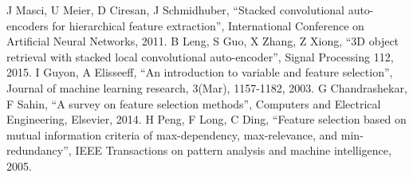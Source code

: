 \documentclass[letterpaper, 10 pt, conference]{ieeeconf}  %
\begin{document}
\begin{thebibliography}{99}
J Masci, U Meier, D Ciresan, J Schmidhuber, ``Stacked convolutional auto-encoders for hierarchical feature extraction'', International Conference on Artificial Neural Networks, 2011.
B Leng, S Guo, X Zhang, Z Xiong, ``3D object retrieval with stacked local convolutional auto-encoder'', Signal Processing 112, 2015.
I Guyon, A Elisseeff, ``An introduction to variable and feature selection'', Journal of machine learning research, 3(Mar), 1157-1182, 2003.
G Chandrashekar, F Sahin, ``A survey on feature selection methods'', Computers and Electrical Engineering, Elsevier,  2014.
H Peng, F Long, C Ding, ``Feature selection based on mutual information criteria of max-dependency, max-relevance, and min-redundancy'', IEEE Transactions on pattern analysis and machine intelligence, 2005.



\end{thebibliography}
\end{document}
